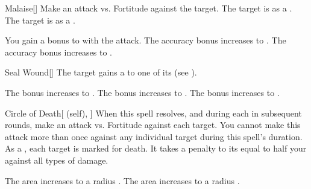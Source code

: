 \lowercase{\hypertarget{spell:Malaise}{}}\label{spell:Malaise}
\begin{freeability}[Rank 1]{\hypertarget{spell:Malaise}{Malaise}}[]
Make an attack vs. Fortitude against the target.
\hit The target is  as a .
\crit The target is  as a .

\rankline
{} You gain a  bonus to  with the attack.
 The accuracy bonus increases to .
 The accuracy bonus increases to .
\end{freeability}
\vspace{0.25em}



\lowercase{\hypertarget{spell:Seal Wound}{}}\label{spell:Seal Wound}
\begin{freeability}[Rank 1]{\hypertarget{spell:Seal Wound}{Seal Wound}}[]
The target gains a   to one of its  (see ).

\rankline
{} The bonus increases to .
 The bonus increases to .
 The bonus increases to .
\end{freeability}
\vspace{0.25em}



\lowercase{\hypertarget{spell:Circle of Death}{}}\label{spell:Circle of Death}
\begin{attuneability}[Rank 3]{\hypertarget{spell:Circle of Death}{Circle of Death}}[ (self), ]
When this spell resolves, and during each  in subsequent rounds, make an attack vs. Fortitude against each target.
You cannot make this attack more than once against any individual target during this spell's duration.
\hit As a , each target is marked for death.
It takes a penalty to its  equal to half your  against all types of damage.

\rankline
{} The area increases to a \arealarge radius .
 The area increases to a \areahuge radius .
\end{attuneability}
\vspace{0.25em}



